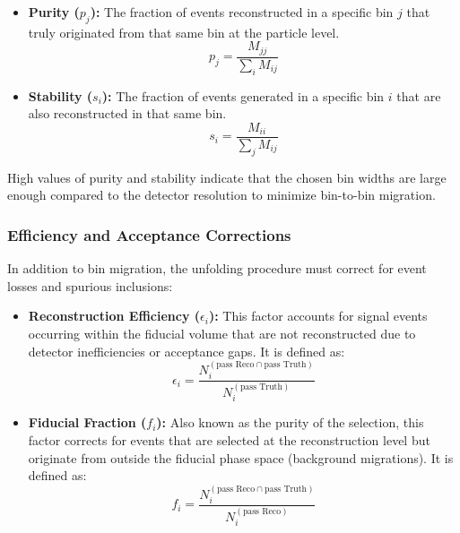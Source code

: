 \begin{itemize}
    \item \textbf{Purity ($p_j$):} The fraction of events reconstructed in a specific bin $j$ that truly originated from that same bin at the particle level.
    \begin{equation}
        p_j = \frac{M_{jj}}{\sum_{i} M_{ij}}
    \end{equation}
    \item \textbf{Stability ($s_i$):} The fraction of events generated in a specific bin $i$ that are also reconstructed in that same bin.
    \begin{equation}
        s_i = \frac{M_{ii}}{\sum_{j} M_{ij}}
    \end{equation}
\end{itemize}

High values of purity and stability indicate that the chosen bin widths are large enough compared to the detector resolution to minimize bin-to-bin migration.

\subsubsection{Efficiency and Acceptance Corrections}
In addition to bin migration, the unfolding procedure must correct for event losses and spurious inclusions:

\begin{itemize}
    \item \textbf{Reconstruction Efficiency ($\epsilon_i$):} This factor accounts for signal events occurring within the fiducial volume that are not reconstructed due to detector inefficiencies or acceptance gaps. It is defined as:
    \begin{equation}
        \epsilon_i = \frac{N_{i}^{(\text{pass Reco} \cap \text{pass Truth})}}{N_{i}^{(\text{pass Truth})}}
    \end{equation}
    
    \item \textbf{Fiducial Fraction ($f_i$):} Also known as the purity of the selection, this factor corrects for events that are selected at the reconstruction level but originate from outside the fiducial phase space (background migrations). It is defined as:
    \begin{equation}
        f_i = \frac{N_{i}^{(\text{pass Reco} \cap \text{pass Truth})}}{N_{i}^{(\text{pass Reco})}}
    \end{equation}
\end{itemize}

